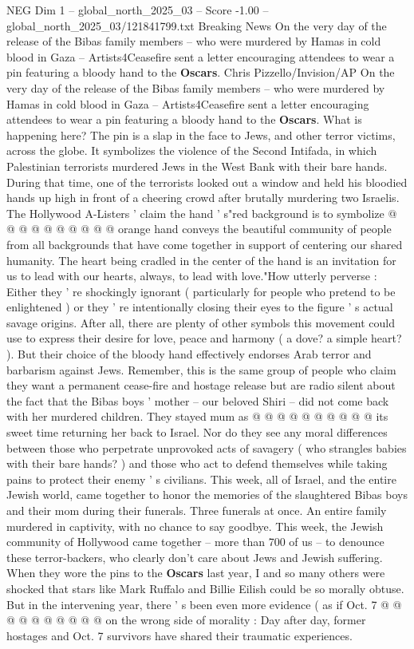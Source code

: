 \begin{textsample}{NEG Dim 1 – global\_north\_2025\_03 – Score -1.00 – global\_north\_2025\_03/121841799.txt}  \label{ex:f1_neg_035}
Breaking News On the very day of the release of the Bibas family members -- who were murdered by Hamas in cold blood in Gaza -- Artists4Ceasefire sent a letter encouraging attendees to wear a pin featuring a bloody hand to the \textbf{Oscars}.
Chris Pizzello/Invision/AP On the very day of the release of the Bibas family members -- who were murdered by Hamas in cold blood in Gaza -- Artists4Ceasefire sent a letter encouraging attendees to wear a pin featuring a bloody hand to the \textbf{Oscars}.
What is happening here?
The pin is a slap in the face to Jews, and other terror victims, across the globe.
It symbolizes the violence of the Second Intifada, in which Palestinian terrorists murdered Jews in the West Bank with their bare hands.
During that time, one of the terrorists looked out a window and held his bloodied hands up high in front of a cheering crowd after brutally murdering two Israelis.
The Hollywood A-Listers ' claim the hand ' s"red background is to symbolize @ @ @ @ @ @ @ @ @ @ orange hand conveys the beautiful community of people from all backgrounds that have come together in support of centering our shared humanity.
The heart being cradled in the center of the hand is an invitation for us to lead with our hearts, always, to lead with love."How utterly perverse : Either they ' re shockingly ignorant ( particularly for people who pretend to be enlightened ) or they ' re intentionally closing their eyes to the figure ' s actual savage origins.
After all, there are plenty of other symbols this movement could use to express their desire for love, peace and harmony ( a dove? a simple heart? ).
But their choice of the bloody hand effectively endorses Arab terror and barbarism against Jews.
Remember, this is the same group of people who claim they want a permanent cease-fire and hostage release but are radio silent about the fact that the Bibas boys ' mother -- our beloved Shiri -- did not come back with her murdered children.
They stayed mum as @ @ @ @ @ @ @ @ @ @ its sweet time returning her back to Israel.
Nor do they see any moral differences between those who perpetrate unprovoked acts of savagery ( who strangles babies with their bare hands? ) and those who act to defend themselves while taking pains to protect their enemy ' s civilians.
This week, all of Israel, and the entire Jewish world, came together to honor the memories of the slaughtered Bibas boys and their mom during their funerals.
Three funerals at once.
An entire family murdered in captivity, with no chance to say goodbye.
This week, the Jewish community of Hollywood came together -- more than 700 of us -- to denounce these terror-backers, who clearly don't care about Jews and Jewish suffering.
When they wore the pins to the \textbf{Oscars} last year, I and so many others were shocked that stars like Mark Ruffalo and Billie Eilish could be so morally obtuse.
But in the intervening year, there ' s been even more evidence ( as if Oct. 7 @ @ @ @ @ @ @ @ @ @ on the wrong side of morality : Day after day, former hostages and Oct. 7 survivors have shared their traumatic experiences.

\end{textsample}
